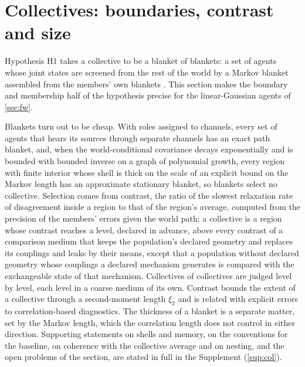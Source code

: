 \section{Collectives: boundaries, contrast and size}\label{sec:col}

Hypothesis H1 takes a collective to be a blanket of blankets: a set of agents whose joint states are screened from the rest of the world by a Markov blanket assembled from the members' own blankets \citep{kirchhoff2018markov,ramstead2018answering,palacios2020markov}. This section makes the boundary and membership half of the hypothesis precise for the linear-Gaussian agents of \cref{sec:fw}.

Blankets turn out to be cheap. With roles assigned to channels, every set of agents that hears its sources through separate channels has an exact path blanket, and, when the world-conditional covariance decays exponentially and is bounded with bounded inverse on a graph of polynomial growth, every region with finite interior whose shell is thick on the scale of an explicit bound on the Markov length has an approximate stationary blanket, so blankets select no collective. Selection comes from contrast, the ratio of the slowest relaxation rate of disagreement inside a region to that of the region's average, computed from the precision of the members' errors given the world path; a collective is a region whose contrast reaches a level, declared in advance, above every contrast of a comparison medium that keeps the population's declared geometry and replaces its couplings and leaks by their means, except that a population without declared geometry whose couplings a declared mechanism generates is compared with the exchangeable state of that mechanism. Collectives of collectives are judged level by level, each level in a coarse medium of its own. Contrast bounds the extent of a collective through a second-moment length $\xi_2$ and is related with explicit errors to correlation-based diagnostics. The thickness of a blanket is a separate matter, set by the Markov length, which the correlation length does not control in either direction. Supporting statements on shells and memory, on the conventions for the baseline, on coherence with the collective average and on nesting, and the open problems of the section, are stated in full in the Supplement (\cref{sup:col}).

